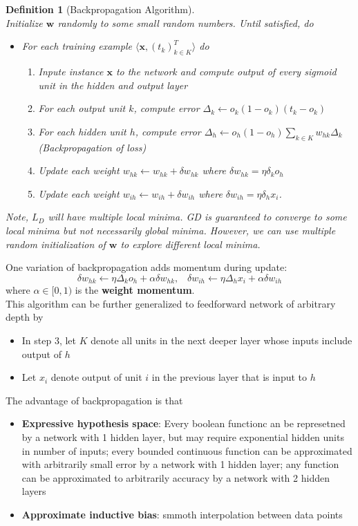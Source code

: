 \documentclass[12pt]{article}
\newtheorem{definition}{Definition}[section]
\theoremstyle{definition}
\begin{document}
\begin{definition}[Backpropagation Algorithm]
\hfill\\\normalfont 
Initialize $\mathbf{w}$ randomly to some small random numbers. Until satisfied, do
\begin{itemize}
	\item For each training example $\langle \mathbf{x}, (t_k)_{k\in K}^T\rangle$ do
	\begin{enumerate}
		\item Inpute instance $\mathbf{x}$ to the network and compute output of every sigmoid unit in the hidden and output layer
		\item For each output unit $k$, compute error $\Delta_k\leftarrow o_k(1-o_k)(t_k-o_k)$
		\item For each hidden unit $h$, compute error $\Delta_h\leftarrow o_h(1-o_h)\sum_{k\in K}w_{hk}\Delta_k$ (Backpropagation of loss)
		\item Update each weight $w_{hk}\leftarrow w_{hk}+\delta w_{hk}$ where $\delta w_{hk}=\eta \delta_k o_h$
		\item Update each weight $w_{ih}\leftarrow w_{ih}+\delta w_{ih}$ where $\delta w_{ih}=\eta \delta_h x_i$. 
	\end{enumerate}
\end{itemize}
Note, $L_D$ will have multiple \textit{local minima}. GD is guaranteed to converge to some local minima but not necessarily global minima. However, we can use \textit{multiple} random initialization of $\mathbf{w}$ to explore different local minima.
\end{definition}
One variation of backpropagation adds momentum during update:
\[
\delta w_{hk}\leftarrow \eta\Delta_ko_h+\alpha\delta w_{hk}, \;\;\;\delta w_{ih}\leftarrow \eta\Delta_hx_i+\alpha\delta w_{ih}
\]
where $\alpha\in[0,1)$ is the \textbf{weight momentum}.\\
This algorithm can be further generalized to feedforward network of arbitrary depth by
\begin{itemize}
	\item In step 3, let $K$ denote all units in the next deeper layer whose inputs include output of $h$
	\item Let $x_i$ denote output of unit $i$ in the previous layer that is input to $h$
\end{itemize}
The advantage of backpropagation is that 
\begin{itemize}
	\item \textbf{Expressive hypothesis space}: Every boolean functionc an be represetned by a network with 1 hidden layer, but may require exponential hidden units in number of inputs; every bounded continuous function can be approximated with arbitrarily small error by a network with 1 hidden layer; any function can be approximated to arbitrarily accuracy by a network with 2 hidden layers
	\item \textbf{Approximate inductive bias}: smmoth interpolation between data points
\end{itemize}
\end{document}
